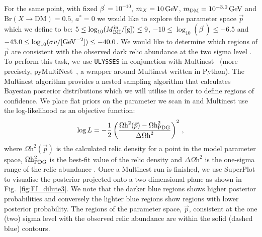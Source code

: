 \documentclass[aps,prd,reprint,twocolumn,preprintnumbers,floatfix,nofootinbib]{revtex4-1}
\newcommand{\mDM}{m_{\rm DM}}
\newcommand{\MBH}{M_{\rm BH}}
\newcommand{\figref}[1]{Fig.~\ref{#1}}
\begin{document}

{For the same point, with fixed $\beta^\prime = 10^{-10}$, 
$m_X = 10\,\rm{GeV}$, $\mDM = 10^{-3.0}\, \rm{GeV}$ and $\mathrm{Br}(X\to \mathrm{DM}) = 0.5$, $a^{*}=0$ we would like to explore the parameter space $\vec{p}$ which we define to be:
$ 5 \leq \log_{10}(\MBH^{\rm in}/[\rm{g}])\leq 9$, $-10 \leq \log_{10}(\beta^\prime) \leq -6.5 $ and $ -43.0\leq \log_{10}(\sigma v/[\rm{GeV}^{-2}]) \leq -40.0$. We would like to determine which regions of $\vec{p}$ are consistent with the observed dark relic abundance at the two sigma level \cite{Aghanim:2018eyx}.
To perform this task, we use {\tt ULYSSES} in conjunction with  {\sc
Multinest}~\cite{Feroz:2008xx,Feroz:2007kg,2013arXiv1306.2144F} (more precisely,
{\sc pyMultiNest}~\cite{pymultinest}, a wrapper around {\sc Multinest} written
in {\sc Python}). The {\sc Multinest} algorithm  provides a
nested sampling algorithm that calculates Bayesian posterior distributions
which we will utilise in order to define regions of confidence.
We place flat priors on the parameter we scan in and {\sc Multinest}  use the log-likelihood  as an objective function:}
\begin{equation}
\log L=-\frac{1}{2}\left(\frac{\Omega \text{h}^2(\vec{p})-\Omega \text{h}^2_{\rm{PDG}}}{\Delta \Omega \text{h}^2}\right)^{2}\,,
\end{equation}
where $\Omega \text{h}^2(\vec{p})$ 
is the calculated relic density for a point in the model parameter space, $\Omega \rm{h}^2_{\rm{PDG}}$ is the best-fit value of the relic density and 
$\Delta \Omega \text{h}^{2}$ is the one-sigma range of the relic abundance \cite{Aghanim:2018eyx}. Once a Multinest run is finished, we use SuperPlot \cite{Fowlie:2016hew} to visualise the posterior projected onto a
two-dimensional plane as shown in \figref{fig:FI_dilute3}. {We note that the darker blue regions shows  higher posterior probabilities and conversely the lighter blue regions show regions with lower posterior probability. The regions of the parameter space, $\vec{p}$, consistent at the one (two) sigma level with the observed relic abundance are within the solid (dashed blue) contours.}
\end{document}
